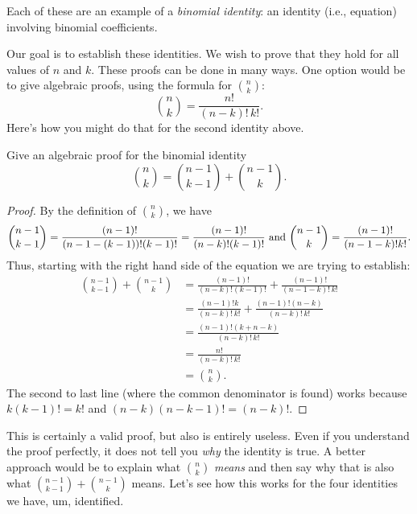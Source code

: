 \documentclass[12pt]{article}
\begin{document}
Each of these are an example of a {\em binomial identity}: an identity (i.e., equation) involving binomial coefficients.

Our goal is to establish these identities.  We wish to prove that they hold for all values of $n$ and $k$.  These proofs can be done in many ways.  One option would be to give algebraic proofs, using the formula for ${n \choose k}$:
\[{n \choose k} = \frac{n!}{(n-k)!\,k!}.\]
Here's how you might do that for the second identity above.

\begin{example}
  Give an algebraic proof for the binomial identity
  \[{n \choose k} = {n-1\choose k-1} + {n-1 \choose k}.\]
  \begin{proof}
    By the definition of ${n \choose k}$, we have
    \[{n-1 \choose k-1} = \frac{(n-1)!}{(n-1-(k-1))!(k-1)!} = \frac{(n-1)!}{(n-k)!(k-1)!} \hfill \mbox{ and } {n-1 \choose k} = \frac{(n-1)!}{(n-1-k)!k!}.\]
    Thus, starting with the right hand side of the equation we are trying to establish:
    \begin{align*}
      {n-1 \choose k-1} + {n-1 \choose k} & = \frac{(n-1)!}{(n-k)!(k-1)!}+ \frac{(n-1)!}{(n-1-k)!\,k!}\\
      & = \frac{(n-1)!k}{(n-k)!\,k!} + \frac{(n-1)!(n-k)}{(n-k)!\,k!}\\
      & = \frac{(n-1)!(k+n-k)}{(n-k)!\,k!} \\
      & = \frac{n!}{(n-k)!\, k!} \\
      & = {n \choose k}.
    \end{align*}
    The second to last line (where the common denominator is found) works because $k(k-1)! = k!$ and $(n-k)(n-k-1)! = (n-k)!$.
  \end{proof}

\end{example}

This is certainly a valid proof, but also is entirely useless.  Even if you understand the proof perfectly, it does not tell you {\em why} the identity is true.  A better approach would be to explain what ${n \choose k}$ {\em means} and then say why that is also what ${n-1 \choose k-1} + {n-1 \choose k}$ means.  Let's see how this works for the four identities we have, um, identified.
\end{document}
